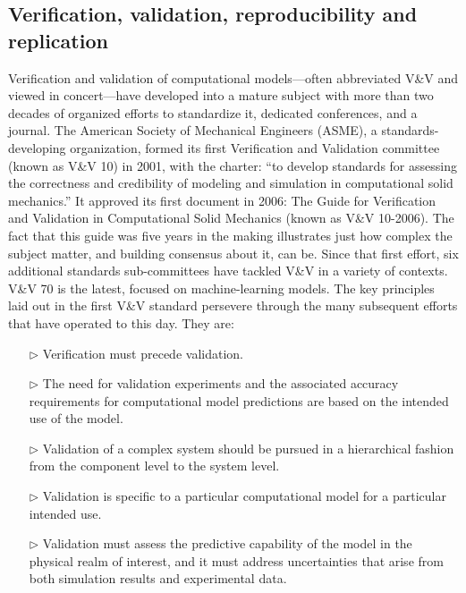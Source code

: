 
\subsection{Verification, validation, reproducibility and replication}

Verification and validation of computational models---often abbreviated V\&V and viewed in concert---have developed into a mature subject with more than two decades of organized efforts to standardize it, dedicated conferences, and a  journal. 
The American Society of Mechanical Engineers (ASME), a standards-developing organization, formed its first Verification and Validation committee (known as V\&V 10) in 2001, with the charter: 
``to develop standards for assessing the correctness and credibility of modeling and simulation in computational solid mechanics.''
It approved its first document in 2006: The Guide for Verification and Validation in Computational Solid Mechanics (known as V\&V 10-2006). 
The fact that this guide was five years in the making illustrates just how complex the subject matter, and building consensus about it, can be. 
Since that first effort, six additional standards sub-committees have tackled V\&V in a variety of contexts. 
V\&V 70 is the latest, focused on machine-learning models.
The key principles laid out in the first V\&V standard persevere through the many subsequent efforts that have operated to this day. 
They are:

\begin{enumerate}

\item[$\triangleright$] Verification must precede validation.
\item[$\triangleright$] The need for validation experiments and the associated accuracy requirements for computational model predictions are based on the intended use of the model.
\item[$\triangleright$] Validation of a complex system should be pursued in a hierarchical fashion from the component level to the system level.
\item[$\triangleright$] Validation is specific to a particular computational model for a particular intended use.
\item[$\triangleright$] Validation must assess the predictive capability of the model in the physical realm of interest, and it
must address uncertainties that arise from both simulation results and experimental data.

\end{enumerate}

